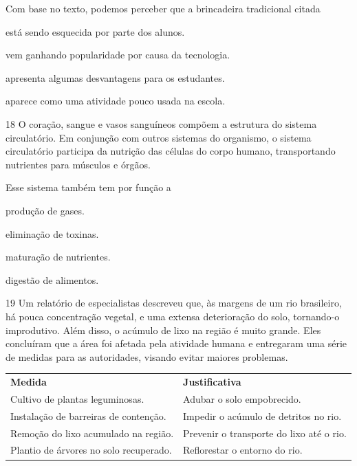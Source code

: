 \noindent{}Com base no texto, podemos perceber que a brincadeira tradicional citada

\begin{escolha}
\item está sendo esquecida por parte dos alunos.

\item vem ganhando popularidade por causa da tecnologia.

\item apresenta algumas desvantagens para os estudantes.

\item aparece como uma atividade pouco usada na escola.
\end{escolha}




\num{18} O coração, sangue e vasos sanguíneos compõem a estrutura do
sistema circulatório. Em conjunção com outros sistemas do organismo, o
sistema circulatório participa da nutrição das células do corpo humano,
transportando nutrientes para músculos e órgãos.

Esse sistema também tem por função a

\begin{minipage}{.5\textwidth}
\begin{escolha}
\item produção de gases.

\item eliminação de toxinas.

\item maturação de nutrientes.

\item digestão de alimentos.
\end{escolha}
\end{minipage}


\num{19} Um relatório de especialistas descreveu que, às margens de
um rio brasileiro, há pouca concentração vegetal, e uma extensa
deterioração do solo, tornando-o improdutivo. Além disso, o acúmulo de
lixo na região é muito grande. Eles concluíram que a área foi afetada
pela atividade humana e entregaram uma série de medidas para as
autoridades, visando evitar maiores problemas.

\begin{longtable}[]{@{}ll@{}}
\toprule
\textbf{Medida} & \textbf{Justificativa}\tabularnewline
Cultivo de plantas leguminosas. & Adubar o solo
empobrecido.\tabularnewline
Instalação de barreiras de contenção. & Impedir o acúmulo de detritos no
rio.\tabularnewline
Remoção do lixo acumulado na região. & Prevenir o transporte do lixo até
o rio.\tabularnewline
Plantio de árvores no solo recuperado. & Reflorestar o entorno do
rio.\tabularnewline
\bottomrule
\end{longtable}

